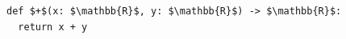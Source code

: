 \documentclass[border=10pt]{standalone}
\begin{document}
\begin{lstlisting}
def $+$(x: $\mathbb{R}$, y: $\mathbb{R}$) -> $\mathbb{R}$:
  return x + y
\end{lstlisting}
\end{document}
